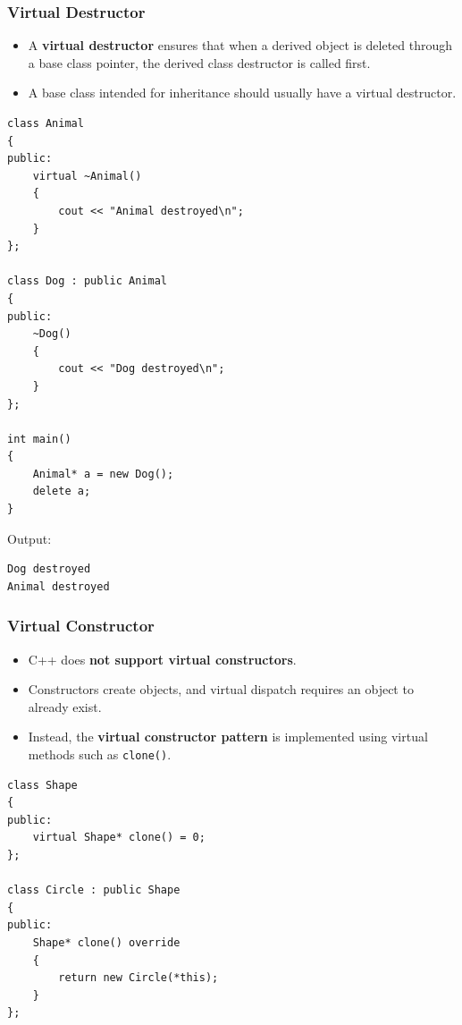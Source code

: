 \documentclass[10pt]{article}
\begin{document}
\subsubsection*{Virtual Destructor}
\begin{itemize}
    \item A \textbf{virtual destructor} ensures that when a derived object is deleted through a base class pointer, the derived class destructor is called first.

    \item A base class intended for inheritance should usually have a virtual destructor.
\end{itemize}

\begin{verbatim}
class Animal
{
public:
    virtual ~Animal()
    {
        cout << "Animal destroyed\n";
    }
};

class Dog : public Animal
{
public:
    ~Dog()
    {
        cout << "Dog destroyed\n";
    }
};

int main()
{
    Animal* a = new Dog();
    delete a;
}
\end{verbatim}

Output:

\begin{verbatim}
Dog destroyed
Animal destroyed
\end{verbatim}


\subsubsection*{Virtual Constructor}
\begin{itemize}
    \item C++ does \textbf{not support virtual constructors}.

    \item Constructors create objects, and virtual dispatch requires an object to already exist.

    \item Instead, the \textbf{virtual constructor pattern} is implemented using virtual methods such as \verb|clone()|.
\end{itemize}

\begin{verbatim}
class Shape
{
public:
    virtual Shape* clone() = 0;
};

class Circle : public Shape
{
public:
    Shape* clone() override
    {
        return new Circle(*this);
    }
};
\end{verbatim}
\end{document}
